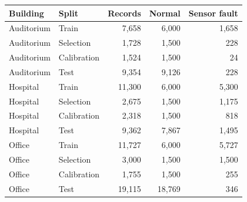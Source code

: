 \begin{tabular}{llrrr}
\toprule
Building & Split & Records & Normal & Sensor fault \\
\midrule
Auditorium & Train & 7,658 & 6,000 & 1,658 \\
Auditorium & Selection & 1,728 & 1,500 & 228 \\
Auditorium & Calibration & 1,524 & 1,500 & 24 \\
Auditorium & Test & 9,354 & 9,126 & 228 \\
Hospital & Train & 11,300 & 6,000 & 5,300 \\
Hospital & Selection & 2,675 & 1,500 & 1,175 \\
Hospital & Calibration & 2,318 & 1,500 & 818 \\
Hospital & Test & 9,362 & 7,867 & 1,495 \\
Office & Train & 11,727 & 6,000 & 5,727 \\
Office & Selection & 3,000 & 1,500 & 1,500 \\
Office & Calibration & 1,755 & 1,500 & 255 \\
Office & Test & 19,115 & 18,769 & 346 \\
\bottomrule
\end{tabular}
